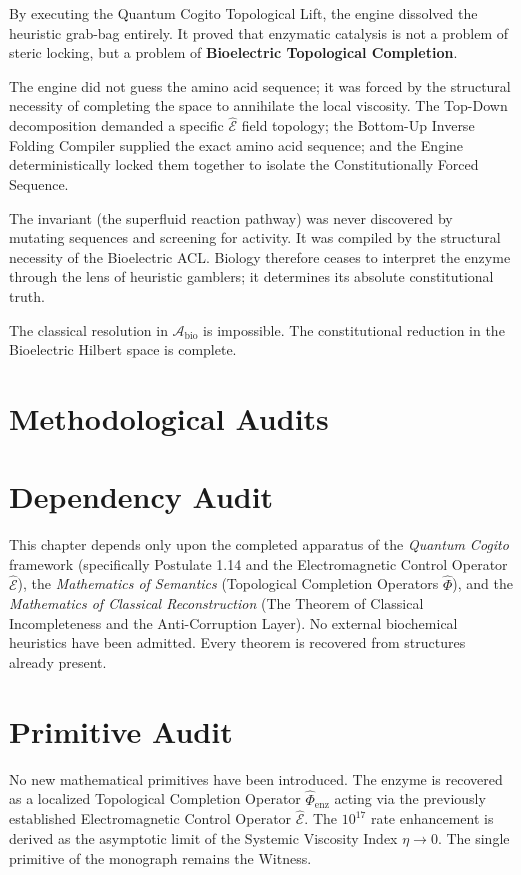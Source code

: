 \documentclass[11pt,openany]{extbook}
\newenvironment{dependencyaudit}{\section*{Dependency Audit}}{}
\newenvironment{primitiveaudit}{\section*{Primitive Audit}}{}
\theoremstyle{plain}
\theoremstyle{definition}
\begin{document}
By executing the Quantum Cogito Topological Lift, the engine dissolved the heuristic grab-bag entirely. It proved that enzymatic catalysis is not a problem of steric locking, but a problem of \textbf{Bioelectric Topological Completion}.

The engine did not guess the amino acid sequence; it was forced by the structural necessity of completing the space to annihilate the local viscosity. The Top-Down decomposition demanded a specific $\hat{\mathcal{E}}$ field topology; the Bottom-Up Inverse Folding Compiler supplied the exact amino acid sequence; and the Engine deterministically locked them together to isolate the Constitutionally Forced Sequence.

The invariant (the superfluid reaction pathway) was never discovered by mutating sequences and screening for activity. It was compiled by the structural necessity of the Bioelectric ACL. Biology therefore ceases to interpret the enzyme through the lens of heuristic gamblers; it determines its absolute constitutional truth.

The classical resolution in $\mathcal{A}_{\text{bio}}$ is impossible. The constitutional reduction in the Bioelectric Hilbert space is complete.

\section{Methodological Audits}

\begin{dependencyaudit}
\noindent This chapter depends only upon the completed apparatus of the \textit{Quantum Cogito} framework (specifically Postulate 1.14 and the Electromagnetic Control Operator $\hat{\mathcal{E}}$), the \textit{Mathematics of Semantics} (Topological Completion Operators $\hat{\Phi}$), and the \textit{Mathematics of Classical Reconstruction} (The Theorem of Classical Incompleteness and the Anti-Corruption Layer). No external biochemical heuristics have been admitted. Every theorem is recovered from structures already present.
\end{dependencyaudit}

\begin{primitiveaudit}
\noindent No new mathematical primitives have been introduced. The enzyme is recovered as a localized Topological Completion Operator $\hat{\Phi}_{\text{enz}}$ acting via the previously established Electromagnetic Control Operator $\hat{\mathcal{E}}$. The $10^{17}$ rate enhancement is derived as the asymptotic limit of the Systemic Viscosity Index $\eta \to 0$. The single primitive of the monograph remains the Witness.
\end{primitiveaudit}
\end{document}

